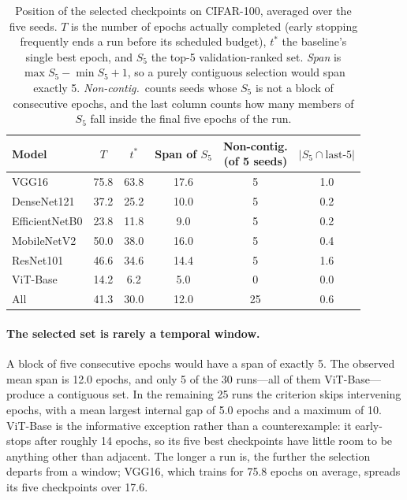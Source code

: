 \documentclass[runningheads]{llncs}
\begin{document}
\begin{table}[htbp]
  \centering
  \caption{Position of the selected checkpoints on CIFAR-100, averaged over
    the five seeds. $T$ is the number of epochs actually completed (early
    stopping frequently ends a run before its scheduled budget), $t^{*}$ the
    baseline's single best epoch, and $S_5$ the top-5 validation-ranked set.
    \emph{Span} is $\max S_5-\min S_5+1$, so a purely contiguous selection
    would span exactly 5. \emph{Non-contig.}\ counts seeds whose $S_5$ is not
    a block of consecutive epochs, and the last column counts how many members
  of $S_5$ fall inside the final five epochs of the run.}
  \label{tab:selection_geometry}
  \small
  \setlength{\tabcolsep}{5pt}
  \begin{tabular}{lccccc}
    \toprule
    Model & $T$ & $t^{*}$ & Span of $S_5$
    & \makecell{Non-contig.\\(of 5 seeds)}
    & $|S_5\cap\text{last-5}|$ \\
    \midrule
    VGG16          & 75.8 & 63.8 & 17.6 & 5 & 1.0 \\
    DenseNet121    & 37.2 & 25.2 & 10.0 & 5 & 0.2 \\
    EfficientNetB0 & 23.8 & 11.8 &  9.0 & 5 & 0.2 \\
    MobileNetV2    & 50.0 & 38.0 & 16.0 & 5 & 0.4 \\
    ResNet101      & 46.6 & 34.6 & 14.4 & 5 & 1.6 \\
    ViT-Base       & 14.2 &  6.2 &  5.0 & 0 & 0.0 \\
    \midrule
    All            & 41.3 & 30.0 & 12.0 & 25 & 0.6 \\
    \bottomrule
  \end{tabular}
\end{table}

\paragraph{The selected set is rarely a temporal window.}
A block of five consecutive epochs would have a span of exactly 5. The
observed mean span is 12.0 epochs, and only 5 of the 30 runs---all of them
ViT-Base---produce a contiguous set. In the remaining 25 runs the criterion
skips intervening epochs, with a mean largest internal gap of 5.0 epochs and a
maximum of 10. ViT-Base is the informative exception rather than a
counterexample: it early-stops after roughly 14 epochs, so its five best
checkpoints have little room to be anything other than adjacent. The longer a
run is, the further the selection departs from a window; VGG16, which trains
for 75.8 epochs on average, spreads its five checkpoints over 17.6.
\end{document}

